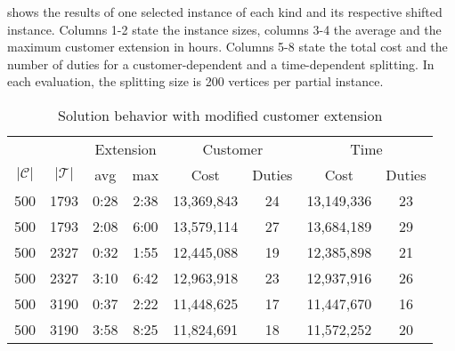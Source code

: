  shows the results of one selected instance of each kind and its respective shifted instance. Columns 1-2 state the instance sizes, columns 3-4 the average and the maximum customer extension in hours. Columns 5-8 state the total cost and the number of duties for a customer-dependent and a time-dependent splitting. In each evaluation, the splitting size is 200 vertices per partial instance.

\begin{table}[htb]
	\centering
	\begin{tabular}{cccccccc}
		\toprule
		&& \multicolumn{2}{c}{Extension} & \multicolumn{2}{c}{Customer} & \multicolumn{2}{c}{Time} \\
		\cmidrule(r){3-8}
		$\vert\mathcal{C}\vert$ & $\vert\mathcal{T}\vert$ & avg & max & Cost & Duties & Cost & Duties \\
		\midrule
		500 & 1793 & 0:28 & 2:38 & 13,369,843 & 24 & 13,149,336 & 23 \\
		500 & 1793 & 2:08 & 6:00 & 13,579,114 & 27 & 13,684,189 & 29 \\
		500 & 2327 & 0:32 & 1:55 & 12,445,088 & 19 & 12,385,898 & 21 \\
		500 & 2327 & 3:10 & 6:42 & 12,963,918 & 23 & 12,937,916 & 26 \\
		500 & 3190 & 0:37 & 2:22 & 11,448,625 & 17 & 11,447,670 & 16 \\
		500 & 3190 & 3:58 & 8:25 & 11,824,691 & 18 & 11,572,252 & 20 \\
		\bottomrule
	\end{tabular}
	\caption{Solution behavior with modified customer extension}
	\label{tab:results:extension}
\end{table}

